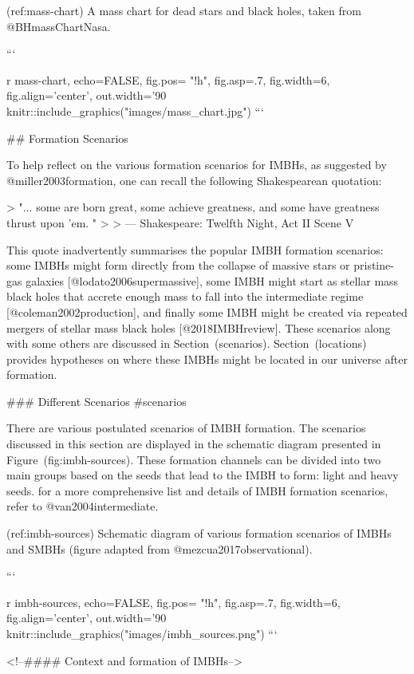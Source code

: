 {{{{{{{{{(ref:mass-chart) A mass chart for dead stars and black holes, taken from @BHmassChartNasa.

```{r mass-chart, echo=FALSE, fig.pos= "!h", fig.asp=.7, fig.width=6, fig.align='center', out.width='90%
knitr::include_graphics("images/mass_chart.jpg")
```



## Formation Scenarios

To help reflect on the various formation scenarios for IMBHs,  
as suggested by @miller2003formation,
one can recall the following Shakespearean quotation:

> "... some are born great, some achieve greatness, and some have greatness thrust upon 'em. "
>
> --- Shakespeare:  Twelfth Night, Act II Scene V

This quote inadvertently summarises the popular IMBH formation
scenarios: some IMBHs might form directly from the collapse of massive
stars or pristine-gas galaxies [@lodato2006supermassive], some IMBH
might start as stellar mass black holes that accrete enough mass to fall
into the intermediate regime [@coleman2002production], and finally some
IMBH might be created via repeated mergers of stellar mass black holes
[@2018IMBHreview]. These scenarios along with some others are discussed
in Section~\@ref(scenarios). Section~\@ref(locations) provides
hypotheses on where these IMBHs might be located in our universe after
formation.

### Different Scenarios {#scenarios}

There are various postulated scenarios of IMBH formation. The scenarios
discussed in this section are displayed in the schematic diagram
presented in Figure~\@ref(fig:imbh-sources). These formation channels
can be divided into two main groups based on the seeds that lead to the
IMBH to form: light and heavy seeds. for a more comprehensive list and
details of IMBH formation scenarios, refer to @van2004intermediate.

(ref:imbh-sources) Schematic diagram of various formation scenarios of IMBHs and SMBHs (figure adapted from @mezcua2017observational).

```{r imbh-sources, echo=FALSE, fig.pos= "!h", fig.asp=.7, fig.width=6, fig.align='center', out.width='90%
knitr::include_graphics("images/imbh_sources.png")
```

<!--####  Context and formation of IMBHs-->



}}}}}}}}}}}

